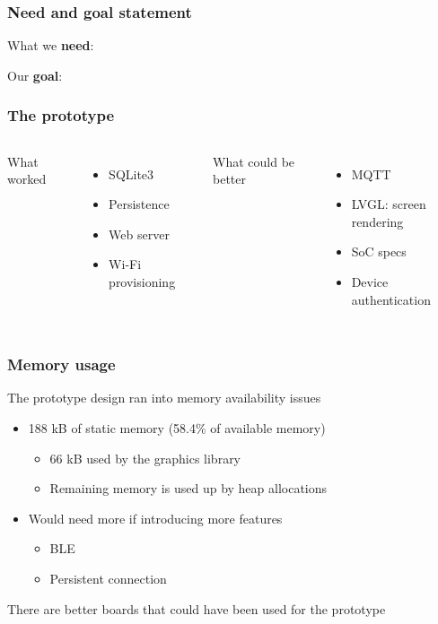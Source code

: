 \documentclass{beamer}
\begin{document}
\frame{\titlepage}

\begin{frame}
  \frametitle{Need and goal statement}

  What we
  \textbf{need}:
  
  \newline
  \newline
  Our
  \textbf{goal}:
  

\end{frame}

\begin{frame}
  \frametitle{The prototype}

  \begin{columns}
    What worked
    \begin{itemize}
      \item SQLite3
      \item Persistence
      \item Web server
      \item Wi-Fi provisioning
    \end{itemize}

    What could be better
    \begin{itemize}
      \item MQTT
      \item LVGL: screen rendering
      \item SoC specs
      \item Device authentication
    \end{itemize}
  \end{columns}


\end{frame}

\begin{frame}
  \frametitle{Memory usage}

  The prototype design ran into memory availability issues
  \begin{itemize}
    \item 188 kB of static memory (58.4\% of available memory)
    \begin{itemize}
      \item 66 kB used by the graphics library
      \item Remaining memory is used up by heap allocations
    \end{itemize}
    \item Would need more if introducing more features
    \begin{itemize}
      \item BLE
      \item Persistent connection
    \end{itemize}
  \end{itemize}
  There are better boards that could have been used for the prototype

\end{frame}
\end{document}
